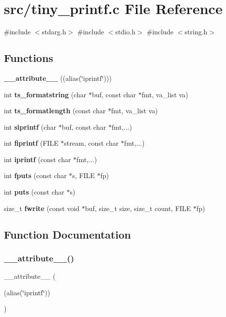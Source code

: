 \section{src/tiny\+\_\+printf.c File Reference}
\label{tiny__printf_8c}
{\ttfamily \#include $<$stdarg.\+h$>$}\newline
{\ttfamily \#include $<$stdio.\+h$>$}\newline
{\ttfamily \#include $<$string.\+h$>$}\newline
\subsection*{Functions}
\begin{DoxyCompactItemize}
\item 
\textbf{ \+\_\+\+\_\+attribute\+\_\+\+\_\+} ((alias(\char`\"{}iprintf\char`\"{})))
\item 
int \textbf{ ts\+\_\+formatstring} (char $\ast$buf, const char $\ast$fmt, va\+\_\+list va)
\item 
int \textbf{ ts\+\_\+formatlength} (const char $\ast$fmt, va\+\_\+list va)
\item 
int \textbf{ siprintf} (char $\ast$buf, const char $\ast$fmt,...)
\item 
int \textbf{ fiprintf} (F\+I\+LE $\ast$stream, const char $\ast$fmt,...)
\item 
int \textbf{ iprintf} (const char $\ast$fmt,...)
\item 
int \textbf{ fputs} (const char $\ast$s, F\+I\+LE $\ast$fp)
\item 
int \textbf{ puts} (const char $\ast$s)
\item 
size\+\_\+t \textbf{ fwrite} (const void $\ast$buf, size\+\_\+t size, size\+\_\+t count, F\+I\+LE $\ast$fp)
\end{DoxyCompactItemize}


\subsection{Function Documentation}
\mbox{\label{tiny__printf_8c_aa50df932185fec4cb2bd19ce38ef7cd6}} 
\subsubsection{\+\_\+\+\_\+attribute\+\_\+\+\_\+()}
{\footnotesize\ttfamily \+\_\+\+\_\+attribute\+\_\+\+\_\+ (\begin{DoxyParamCaption}\item[{(alias(\char`\"{}iprintf\char`\"{}))}]{ }\end{DoxyParamCaption})}



